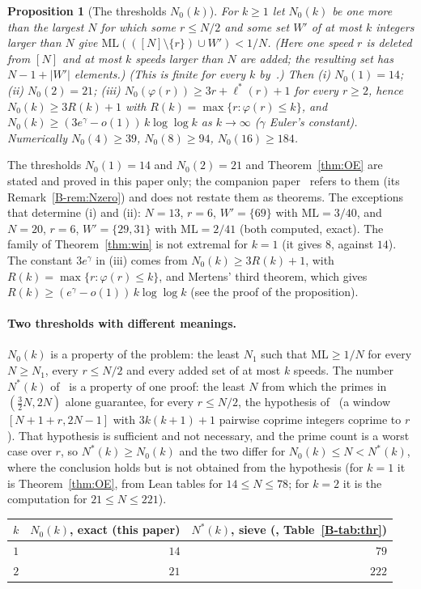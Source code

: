 \documentclass[11pt]{article}
\newtheorem{proposition}[theorem]{Proposition}
\theoremstyle{definition}
\theoremstyle{remark}
\newcommand{\ML}{\mathrm{ML}}
\newcommand{\xC}[1]{\ref{B-#1}}
\begin{document}
\begin{proposition}[The thresholds $N_0(k)$]\label{prop:N0}
For $k\ge1$ let $N_0(k)$ be one more than the largest $N$ for which some $r\le N/2$ and some set $W'$ of at most $k$ integers larger than $N$ give $\ML(([N]\setminus\{r\})\cup W')<1/N$. (Here one speed $r$ is deleted from $[N]$ and at most $k$ speeds larger than $N$ are added; the resulting set has $N-1+|W'|$ elements.) (This is finite for every $k$ by~\cite[Theorem~\xC{thm:thr}(b)]{B}.) Then (i) $N_0(1)=14$; (ii) $N_0(2)=21$; (iii) $N_0(\varphi(r))\ge3r+\ell^*(r)+1$ for every $r\ge2$, hence $N_0(k)\ge3R(k)+1$ with $R(k)=\max\{r:\varphi(r)\le k\}$, and $N_0(k)\ge(3e^{\gamma}-o(1))\,k\log\log k$ as $k\to\infty$ ($\gamma$ Euler's constant). Numerically $N_0(4)\ge39$, $N_0(8)\ge94$, $N_0(16)\ge184$.
\end{proposition}
The thresholds $N_0(1)=14$ and $N_0(2)=21$ and Theorem~\ref{thm:OE} are stated and proved in this paper only; the companion paper~\cite{B} refers to them (its Remark~\xC{rem:Nzero}) and does not restate them as theorems. The exceptions that determine (i) and (ii): $N=13$, $r=6$, $W'=\{69\}$ with $\ML=3/40$, and $N=20$, $r=6$, $W'=\{29,31\}$ with $\ML=2/41$ (both computed, exact). The family of Theorem~\ref{thm:win} is not extremal for $k=1$ (it gives $8$, against $14$). The constant $3e^{\gamma}$ in (iii) comes from $N_0(k)\ge3R(k)+1$, with $R(k)=\max\{r:\varphi(r)\le k\}$, and Mertens\textquoteright{} third theorem, which gives $R(k)\ge(e^{\gamma}-o(1))\,k\log\log k$ (see the proof of the proposition).

\paragraph{Two thresholds with different meanings.}
$N_0(k)$ is a property of the problem: the least $N_1$ such that $\ML\ge1/N$ for every $N\ge N_1$, every $r\le N/2$ and every added set of at most $k$ speeds. The number $N^*(k)$ of~\cite{B} is a property of one proof: the least $N$ from which the primes in $(\frac32N,2N)$ alone guarantee, for every $r\le N/2$, the hypothesis of~\cite[Theorem~\xC{thm:S}]{B} (a window $[N+1+r,2N-1]$ with $3k(k+1)+1$ pairwise coprime integers coprime to $r$). That hypothesis is sufficient and not necessary, and the prime count is a worst case over $r$, so $N^*(k)\ge N_0(k)$ and the two differ for $N_0(k)\le N<N^*(k)$, where the conclusion holds but is not obtained from the hypothesis (for $k=1$ it is Theorem~\ref{thm:OE}, from Lean tables for $14\le N\le78$; for $k=2$ it is the computation for $21\le N\le221$).
\begin{center}
\small
\begin{tabular}{r r r}
\toprule
$k$ & $N_0(k)$, exact (this paper) & $N^*(k)$, sieve (\cite{B}, Table~\xC{tab:thr}) \\
\midrule
$1$ & $14$ & $79$ \\
$2$ & $21$ & $222$ \\
\bottomrule
\end{tabular}
\end{center}
\end{document}

